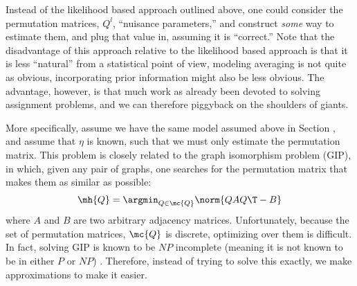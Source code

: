 Instead of the likelihood based approach outlined above, one could consider the permutation matrices, $Q^l$, ``nuisance parameters,'' and construct \emph{some} way to estimate them, and plug that value in, assuming it is ``correct.'' Note that the disadvantage of this approach relative to the likelihood based approach is that it is less ``natural'' from a statistical point of view, modeling averaging is not quite as obvious, incorporating prior information might also be less obvious.  The advantage, however, is that much work as already been devoted to solving assignment problems, and we can therefore piggyback on the shoulders of giants.  %

More specifically, assume we have the same model assumed above in Section \label{sec:lik}, and assume that $\eta$ is known, such that we must only estimate the permutation matrix.  This problem is closely related to the graph isomorphism problem (GIP), in which, given any pair of graphs, one searches for the permutation matrix that makes them as similar as possible:
\begin{align}
	\mh{Q} = \argmin_{Q \in \mc{Q}} \norm{Q A Q\T - B}
\end{align}
where $A$ and $B$ are two arbitrary adjacency matrices.  Unfortunately, because the set of permutation matrices, $\mc{Q}$ is discrete, optimizing over them is difficult.  In fact, solving GIP is known to be $NP$ incomplete (meaning it is not known to be in either $P$ or $NP$) \cite{??}.  Therefore, instead of trying to solve this exactly, we make approximations to make it easier.  

